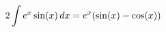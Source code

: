 \documentclass[preview]{standalone}
\begin{document}
\begin{align*}
\special{dvisvgm:raw <g id='unique000'>}2 \int e^x \sin(x) \, dx = e^x (\sin(x) - \cos(x))\special{dvisvgm:raw </g>}
\end{align*}
\end{document}
